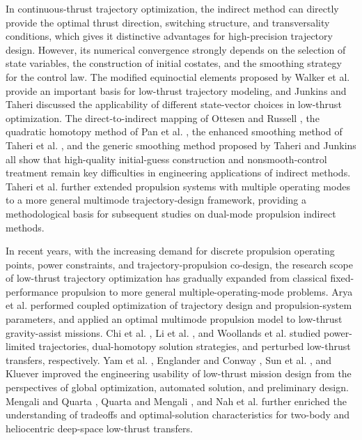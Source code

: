 ﻿\documentclass{IEEEtaes}
\begin{document}
In continuous-thrust trajectory optimization, the indirect method can directly provide the optimal thrust direction, switching structure, and transversality conditions, which gives it distinctive advantages for high-precision trajectory design. However, its numerical convergence strongly depends on the selection of state variables, the construction of initial costates, and the smoothing strategy for the control law. The modified equinoctial elements proposed by Walker et al. \cite{walker1985} provide an important basis for low-thrust trajectory modeling, and Junkins and Taheri \cite{junkins2019} discussed the applicability of different state-vector choices in low-thrust optimization. The direct-to-indirect mapping of Ottesen and Russell \cite{ottesen2024}, the quadratic homotopy method of Pan et al. \cite{pan2019}, the enhanced smoothing method of Taheri et al. \cite{taheri2016}, and the generic smoothing method proposed by Taheri and Junkins \cite{taheri2018} all show that high-quality initial-guess construction and nonsmooth-control treatment remain key difficulties in engineering applications of indirect methods. Taheri et al. \cite{taheri2020b} further extended propulsion systems with multiple operating modes to a more general multimode trajectory-design framework, providing a methodological basis for subsequent studies on dual-mode propulsion indirect methods.

In recent years, with the increasing demand for discrete propulsion operating points, power constraints, and trajectory-propulsion co-design, the research scope of low-thrust trajectory optimization has gradually expanded from classical fixed-performance propulsion to more general multiple-operating-mode problems. Arya et al. \cite{arya2021a,arya2021b} performed coupled optimization of trajectory design and propulsion-system parameters, and applied an optimal multimode propulsion model to low-thrust gravity-assist missions. Chi et al. \cite{chi2018}, Li et al. \cite{li2019}, and Woollands et al. \cite{woollands2020} studied power-limited trajectories, dual-homotopy solution strategies, and perturbed low-thrust transfers, respectively. Yam et al. \cite{yam2013}, Englander and Conway \cite{englander2017}, Sun et al. \cite{sun2016}, and Kluever \cite{kluever2014} improved the engineering usability of low-thrust mission design from the perspectives of global optimization, automated solution, and preliminary design. Mengali and Quarta \cite{mengali2008}, Quarta and Mengali \cite{quarta2011}, and Nah et al. \cite{nah2001} further enriched the understanding of tradeoffs and optimal-solution characteristics for two-body and heliocentric deep-space low-thrust transfers.
\end{document}
